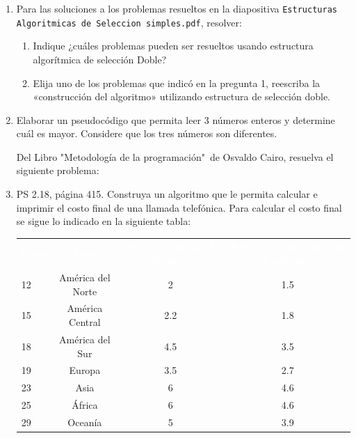 \documentclass[spanish,11pt,twoside]{article}
\newcommand{\head}[1]{ %
	\textcolor{white}{\textbf{#1}}}
\renewcommand{\arraystretch}{1.5} %
\begin{document}
\begin{enumerate}
	\item Para las soluciones a los problemas resueltos en la diapositiva \texttt{Estructuras Algoritmicas de Seleccion simples.pdf}, resolver:
	\begin{enumerate}
		\item Indique ¿cuáles problemas pueden ser resueltos usando estructura algorítmica de selección Doble?
		\item Elija uno de los problemas que indicó en la pregunta 1, reescriba la «construcción del algoritmo» utilizando estructura de selección doble.
	\end{enumerate}
	

	\item Elaborar un pseudocódigo que permita leer 3 números enteros y determine cuál es mayor. Considere que los tres números son diferentes.	
	
	
	\vspace{24pt}

	Del Libro "Metodología de la programación"\ de Osvaldo Cairo, resuelva el siguiente
	problema:
	
	
	
	\item PS 2.18, página 415. Construya un algoritmo que le permita calcular e imprimir el costo final de una llamada telefónica. Para calcular el costo final se sigue lo indicado en la siguiente tabla:
	
	\begin{table}[H]%
		\renewcommand{\arraystretch}{1.5} %
		\centering\footnotesize%
		\sffamily%
		
		\label{table:problemas:llamada}
		\begin{tabular}{lccc}
			\rowcolor{uasblue}%
			\head{Clave}& \head{Zona} 		& \head{Precio/Minuto (3 primeros)} & \head{Precio/Minuto (del 4to en adelante)}\\
			12 			& América del Norte	& 2									& 1.5 \\
			15			& América Central	& 2.2								& 1.8 \\
			18			& América del Sur	& 4.5								& 3.5 \\
			19			& Europa			& 3.5								& 2.7 \\
			23			& Asia				& 6									& 4.6 \\
			25			& África			& 6									& 4.6 \\
			29			& Oceanía			& 5									& 3.9 \\
		\end{tabular}
	\end{table}
	
\end{enumerate}
\end{document}
